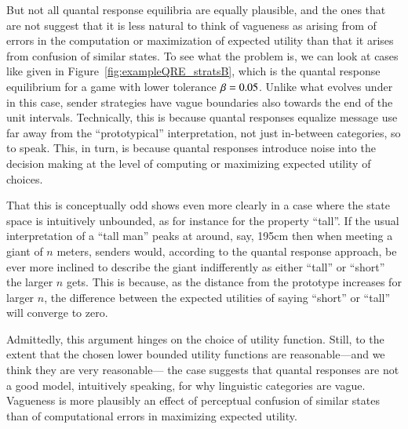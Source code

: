 But not all quantal response equilibria are equally plausible, and the
ones that are not suggest that it is less natural to think of
vagueness as arising from of errors in the computation or maximization
of expected utility than that it arises from confusion of similar
states. To see what the problem is, we can look at cases like given in
Figure~\ref{fig:exampleQRE_stratsB}, which is the quantal response
equilibrium for a game with lower tolerance $\beta = 0.05$. Unlike
what evolves under \rdd in this case, sender strategies have vague
boundaries also towards the end of the unit intervals. Technically,
this is because quantal responses equalize message use far away from
the ``prototypical'' interpretation, not just in-between categories,
so to speak. This, in turn, is because quantal responses introduce
noise into the decision making at the level of computing or maximizing
expected utility of choices.

That this is conceptually odd shows even more clearly in a case where
the state space is intuitively unbounded, as for instance for the
property ``tall''. If the usual interpretation of a ``tall man'' peaks
at around, say, 195cm then when meeting a giant of $n$ meters, senders
would, according to the quantal response approach, be ever more
inclined to describe the giant indifferently as either ``tall'' or
``short'' the larger $n$ gets. This is because, as the distance from
the prototype increases for larger $n$, the difference between the
expected utilities of saying ``short'' or ``tall'' will converge to
zero. 

Admittedly, this argument hinges on the choice of utility
function. Still, to the extent that the chosen lower bounded utility
functions are reasonable---and we think they are very reasonable---
the case suggests that quantal responses are not a good model,
intuitively speaking, for why linguistic categories are
vague. Vagueness is more plausibly an effect of perceptual confusion
of similar states than of computational errors in maximizing expected
utility.




